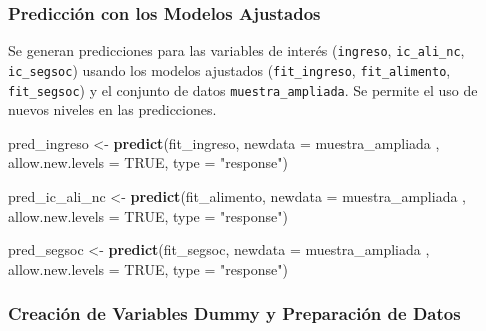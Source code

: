 \documentclass[
  12pt,
]{book}
\newenvironment{Shaded}{\begin{snugshade}}{\end{snugshade}}
\newcommand{\AttributeTok}[1]{\textcolor[rgb]{0.13,0.29,0.53}{#1}}
\newcommand{\ConstantTok}[1]{\textcolor[rgb]{0.56,0.35,0.01}{#1}}
\newcommand{\FunctionTok}[1]{\textcolor[rgb]{0.13,0.29,0.53}{\textbf{#1}}}
\newcommand{\NormalTok}[1]{#1}
\newcommand{\OtherTok}[1]{\textcolor[rgb]{0.56,0.35,0.01}{#1}}
\newcommand{\StringTok}[1]{\textcolor[rgb]{0.31,0.60,0.02}{#1}}
\begin{document}
\hypertarget{predicciuxf3n-con-los-modelos-ajustados}{%
\subsubsection*{Predicción con los Modelos Ajustados}\label{predicciuxf3n-con-los-modelos-ajustados}}

Se generan predicciones para las variables de interés (\texttt{ingreso}, \texttt{ic\_ali\_nc}, \texttt{ic\_segsoc}) usando los modelos ajustados (\texttt{fit\_ingreso}, \texttt{fit\_alimento}, \texttt{fit\_segsoc}) y el conjunto de datos \texttt{muestra\_ampliada}. Se permite el uso de nuevos niveles en las predicciones.

\begin{Shaded}
\begin{Highlighting}[]
\NormalTok{pred\_ingreso }\OtherTok{\textless{}{-}} \FunctionTok{predict}\NormalTok{(fit\_ingreso, }
                        \AttributeTok{newdata =}\NormalTok{ muestra\_ampliada ,}
                        \AttributeTok{allow.new.levels =} \ConstantTok{TRUE}\NormalTok{, }
                        \AttributeTok{type =} \StringTok{"response"}\NormalTok{)}

\NormalTok{pred\_ic\_ali\_nc }\OtherTok{\textless{}{-}} \FunctionTok{predict}\NormalTok{(fit\_alimento, }
                          \AttributeTok{newdata =}\NormalTok{ muestra\_ampliada ,}
                          \AttributeTok{allow.new.levels =} \ConstantTok{TRUE}\NormalTok{, }
                          \AttributeTok{type =} \StringTok{"response"}\NormalTok{)}

\NormalTok{pred\_segsoc }\OtherTok{\textless{}{-}} \FunctionTok{predict}\NormalTok{(fit\_segsoc, }
                       \AttributeTok{newdata =}\NormalTok{ muestra\_ampliada ,}
                       \AttributeTok{allow.new.levels =} \ConstantTok{TRUE}\NormalTok{, }
                       \AttributeTok{type =} \StringTok{"response"}\NormalTok{)}
\end{Highlighting}
\end{Shaded}

\hypertarget{creaciuxf3n-de-variables-dummy-y-preparaciuxf3n-de-datos}{%
\subsubsection*{Creación de Variables Dummy y Preparación de Datos}\label{creaciuxf3n-de-variables-dummy-y-preparaciuxf3n-de-datos}}
\end{document}
